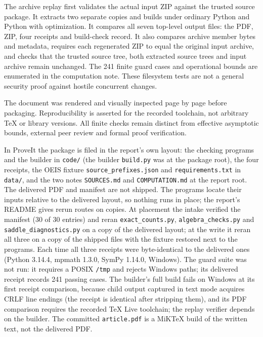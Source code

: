 The archive replay first validates the actual input ZIP against the trusted source package. It extracts two separate copies and builds under ordinary Python and Python with optimization. It compares all seven top-level output files: the PDF, ZIP, four receipts and build-check record. It also compares archive member bytes and metadata, requires each regenerated ZIP to equal the original input archive, and checks that the trusted source tree, both extracted source trees and input archive remain unchanged. The 241 finite guard cases and operational bounds are enumerated in the computation note. These filesystem tests are not a general security proof against hostile concurrent changes.

The document was rendered and visually inspected page by page before packaging. Reproducibility is asserted for the recorded toolchain, not arbitrary TeX or library versions. All finite checks remain distinct from effective asymptotic bounds, external peer review and formal proof verification.

\begin{writenote}
In ProveIt the package is filed in the report's own layout: the checking
programs and the builder in \nolinkurl{code/} (the builder
\nolinkurl{build.py} was at the package root), the four receipts, the OEIS
fixture \nolinkurl{source_prefixes.json} and \nolinkurl{requirements.txt} in
\nolinkurl{data/}, and the two notes \nolinkurl{SOURCES.md} and
\nolinkurl{COMPUTATION.md} at the report root. The delivered PDF and
manifest are not shipped. The programs locate their inputs relative to the
delivered layout, so nothing runs in place; the report's README gives
rerun routes on copies. At placement the intake verified the manifest
(30 of 30 entries) and reran \nolinkurl{exact_counts.py},
\nolinkurl{algebra_checks.py} and \nolinkurl{saddle_diagnostics.py} on a
copy of the delivered layout; at the write it reran all three on a copy of
the shipped files with the fixture restored next to the programs. Each time
all three receipts were byte-identical to the delivered ones (Python 3.14.4,
mpmath 1.3.0, SymPy 1.14.0, Windows). The guard suite was not run: it
requires a POSIX \nolinkurl{/tmp} and rejects Windows paths; its delivered
receipt records 241 passing cases. The builder's full build fails on
Windows at its first receipt comparison, because child output captured in
text mode acquires CRLF line endings (the receipt is identical after
stripping them), and its PDF comparison requires the recorded TeX Live
toolchain; the replay verifier depends on the builder. The committed
\nolinkurl{article.pdf} is a MiKTeX build of the written text, not the
delivered PDF.
\end{writenote}

